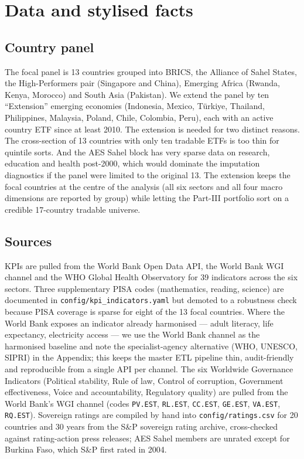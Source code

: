 \section{Data and stylised facts}\label{sec:data}

\subsection{Country panel}

The focal panel is 13 countries grouped into BRICS, the Alliance of Sahel States, the High-Performers pair (Singapore and China), Emerging Africa (Rwanda, Kenya, Morocco) and South Asia (Pakistan). We extend the panel by ten ``Extension'' emerging economies (Indonesia, Mexico, T\"urkiye, Thailand, Philippines, Malaysia, Poland, Chile, Colombia, Peru), each with an active country ETF since at least 2010. The extension is needed for two distinct reasons. The cross-section of 13 countries with only ten tradable ETFs is too thin for quintile sorts. And the AES Sahel block has very sparse data on research, education and health post-2000, which would dominate the imputation diagnostics if the panel were limited to the original 13. The extension keeps the focal countries at the centre of the analysis (all six sectors and all four macro dimensions are reported by group) while letting the Part-III portfolio sort on a credible 17-country tradable universe.

\subsection{Sources}

KPIs are pulled from the World Bank Open Data API, the World Bank WGI channel and the WHO Global Health Observatory for 39 indicators across the six sectors. Three supplementary PISA codes (mathematics, reading, science) are documented in \texttt{config/kpi\_indicators.yaml} but demoted to a robustness check because PISA coverage is sparse for eight of the 13 focal countries. Where the World Bank exposes an indicator already harmonised --- adult literacy, life expectancy, electricity access --- we use the World Bank channel as the harmonised baseline and note the specialist-agency alternative (WHO, UNESCO, SIPRI) in the Appendix; this keeps the master ETL pipeline thin, audit-friendly and reproducible from a single API per channel. The six Worldwide Governance Indicators (Political stability, Rule of law, Control of corruption, Government effectiveness, Voice and accountability, Regulatory quality) are pulled from the World Bank's WGI channel (codes \texttt{PV.EST}, \texttt{RL.EST}, \texttt{CC.EST}, \texttt{GE.EST}, \texttt{VA.EST}, \texttt{RQ.EST}). Sovereign ratings are compiled by hand into \texttt{config/ratings.csv} for 20 countries and 30 years from the S\&P sovereign rating archive, cross-checked against rating-action press releases; AES Sahel members are unrated except for Burkina Faso, which S\&P first rated in 2004.

